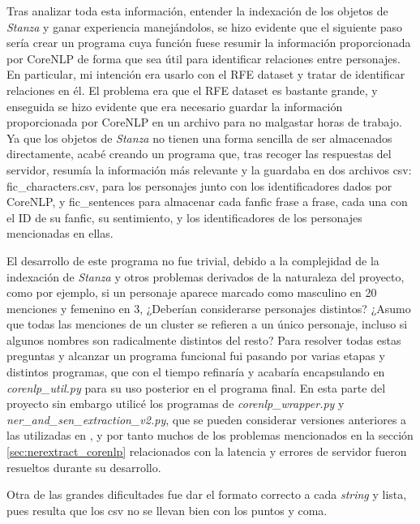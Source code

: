 \documentclass{pre-tfg}
\begin{document}
Tras analizar toda esta información, entender la indexación de los objetos de \textit{Stanza} y ganar experiencia manejándolos, se hizo evidente que el siguiente paso sería crear un programa cuya función fuese resumir la información proporcionada por CoreNLP de forma que sea útil para identificar relaciones entre personajes. En particular, mi intención era usarlo con el RFE dataset y tratar de identificar relaciones en él.
El problema era que el RFE dataset es bastante grande, y enseguida se hizo evidente que era necesario guardar la información proporcionada por CoreNLP en un archivo para no malgastar horas de trabajo. Ya que los objetos de \textit{Stanza} no tienen una forma sencilla de ser almacenados directamente, acabé creando un programa que, tras recoger las respuestas del servidor, resumía la información más relevante y la guardaba en dos archivos csv: fic\_characters.csv, para los personajes junto con los identificadores dados por CoreNLP, y fic\_sentences para almacenar cada fanfic frase a frase, cada una con el ID de su fanfic, su sentimiento, y los identificadores de los personajes mencionadas en ellas.


El desarrollo de este programa no fue trivial, debido a la complejidad de la indexación de \textit{Stanza} y otros problemas derivados de la naturaleza del proyecto, como por ejemplo, si un personaje aparece marcado como masculino en 20 menciones y femenino en 3, ¿Deberían considerarse personajes distintos? ¿Asumo que todas las menciones de un cluster se refieren a un único personaje, incluso si algunos nombres son radicalmente distintos del resto?
Para resolver todas estas preguntas y alcanzar un programa funcional fui pasando por varias etapas y distintos programas, que con el tiempo refinaría y acabaría encapsulando en \textit{corenlp\_util.py} para su uso posterior en el programa final. En esta parte del proyecto sin embargo utilicé los programas de \textit{corenlp\_wrapper.py} y \textit{ner\_and\_sen\_extraction\_v2.py}, que se pueden considerar versiones anteriores a las utilizadas en , y por tanto muchos de los problemas mencionados en la sección \ref{sec:nerextract_corenlp} relacionados con la latencia y errores de servidor fueron resueltos durante su desarrollo.

Otra de las grandes dificultades fue dar el formato correcto a cada \textit{string} y lista, pues resulta que los csv no se llevan bien con los puntos y coma.
\end{document}
